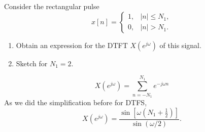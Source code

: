 \begin{frame}
    {
        \begin{figure}
            \centering
            
        \end{figure}

    }
\end{frame}


\begin{frame}
    \begin{example}
        Consider the rectangular pulse
        \begin{equation*}
            x[n] = \begin{cases}
                1, & |n| \leq N_1,\\
                0, & |n| > N_1.
            \end{cases}
        \end{equation*}
        \begin{enumerate}
            \item Obtain an expression for the DTFT $X(e^{j\omega})$ of this signal.
            \item Sketch for $N_1 = 2$.
        \end{enumerate}
     \end{example}

        \begin{figure}
            \centering
            
        \end{figure}

\end{frame}

\begin{frame}
	\begin{equation*}
		X(e^{j\omega}) = \sum_{n = -N_1}^{N_1}e^{-j\omega n}
	\end{equation*}
	As we did the simplification before for DTFS,
	\pause
	\begin{equation*}
		X(e^{j\omega}) = \frac{\sin\left[\omega \left(N_1 + \frac{1}{2}\right)\right]}{\sin(\omega/2)}.
	\end{equation*}
\end{frame}



\begin{frame}[plain]

    \begin{figure}
        \centering
        
    \end{figure}
\end{frame}



